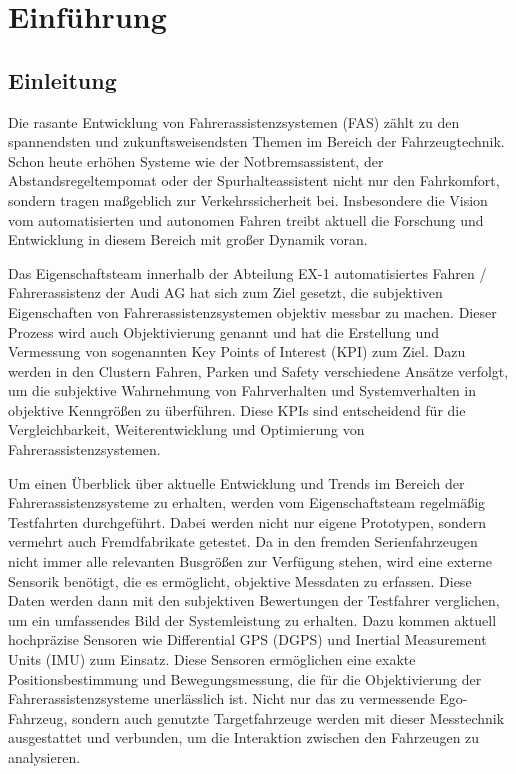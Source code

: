 \chapter{Einführung}
\label{einfuehrung}

\section{Einleitung}
Die rasante Entwicklung von Fahrerassistenzsystemen (FAS) zählt zu den spannendsten und zukunftsweisendsten Themen im Bereich der Fahrzeugtechnik. Schon heute erhöhen Systeme wie der Notbremsassistent, der Abstandsregeltempomat oder der Spurhalteassistent nicht nur den Fahrkomfort, sondern tragen maßgeblich zur Verkehrssicherheit bei. Insbesondere die Vision vom automatisierten und autonomen Fahren treibt aktuell die Forschung und Entwicklung in diesem Bereich mit großer Dynamik voran.

Das Eigenschaftsteam innerhalb der Abteilung EX-1 automatisiertes Fahren / Fahrerassistenz der Audi AG hat sich zum Ziel gesetzt, die subjektiven Eigenschaften von Fahrerassistenzsystemen objektiv messbar zu machen. Dieser Prozess wird auch Objektivierung genannt und hat die Erstellung und Vermessung von sogenannten Key Points of Interest (KPI) zum Ziel. Dazu werden in den Clustern Fahren, Parken und Safety verschiedene Ansätze verfolgt, um die subjektive Wahrnehmung von Fahrverhalten und Systemverhalten in objektive Kenngrößen zu überführen. Diese KPIs sind entscheidend für die Vergleichbarkeit, Weiterentwicklung und Optimierung von Fahrerassistenzsystemen.

Um einen Überblick über aktuelle Entwicklung und Trends im Bereich der Fahrerassistenzsysteme zu erhalten, werden vom Eigenschaftsteam regelmäßig Testfahrten durchgeführt. Dabei werden nicht nur eigene Prototypen, sondern vermehrt auch Fremdfabrikate getestet. Da in den fremden Serienfahrzeugen nicht immer alle relevanten Busgrößen zur Verfügung stehen, wird eine externe Sensorik benötigt, die es ermöglicht, objektive Messdaten zu erfassen. Diese Daten werden dann mit den subjektiven Bewertungen der Testfahrer verglichen, um ein umfassendes Bild der Systemleistung zu erhalten.
Dazu kommen aktuell hochpräzise Sensoren wie Differential GPS (DGPS) und Inertial Measurement Units (IMU) zum Einsatz. Diese Sensoren ermöglichen eine exakte Positionsbestimmung und Bewegungsmessung, die für die Objektivierung der Fahrerassistenzsysteme unerlässlich ist. Nicht nur das zu vermessende Ego-Fahrzeug, sondern auch genutzte Targetfahrzeuge werden mit dieser Messtechnik ausgestattet und verbunden, um die Interaktion zwischen den Fahrzeugen zu analysieren.

